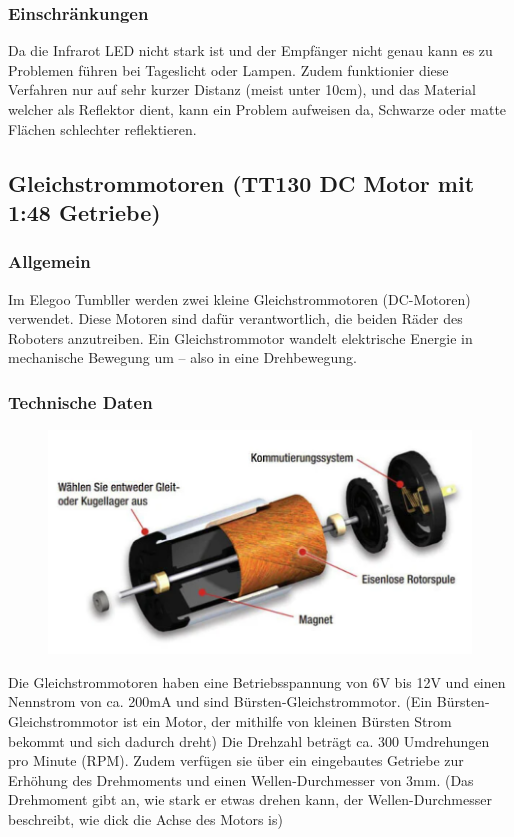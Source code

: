 \subsubsection{Einschränkungen}
Da die Infrarot LED nicht stark ist  und der Empfänger nicht genau kann es zu Problemen führen bei Tageslicht oder Lampen. 
Zudem funktionier diese Verfahren nur auf sehr kurzer Distanz (meist unter 10cm), und das Material welcher als Reflektor dient, kann ein Problem aufweisen da, 
Schwarze oder matte Flächen schlechter reflektieren.
%
\subsection{Gleichstrommotoren (TT130 DC Motor mit 1:48 Getriebe)}
%
\subsubsection{Allgemein}
Im Elegoo Tumbller werden zwei kleine Gleichstrommotoren (DC-Motoren) verwendet.
Diese Motoren sind dafür verantwortlich, die beiden Räder des Roboters anzutreiben.
Ein Gleichstrommotor wandelt elektrische Energie in mechanische Bewegung um – also in eine Drehbewegung.
\subsubsection{Technische Daten}
\begin{figure}[H]
    \includegraphics[width=1\textwidth, center]{img/Hardware/gleichstrommotor.png}
\end{figure}
Die Gleichstrommotoren haben eine Betriebsspannung von 6V bis 12V und einen Nennstrom von ca. 200mA und sind Bürsten-Gleichstrommotor. 
(Ein Bürsten-Gleichstrommotor ist ein Motor, der mithilfe von kleinen Bürsten Strom bekommt und sich dadurch dreht) Die Drehzahl beträgt ca. 300 Umdrehungen pro Minute (RPM). 
Zudem verfügen sie über ein eingebautes Getriebe zur Erhöhung des Drehmoments und einen Wellen-Durchmesser von 3mm. 
(Das Drehmoment gibt an, wie stark er etwas drehen kann, der Wellen-Durchmesser beschreibt, wie dick die Achse des Motors is)
